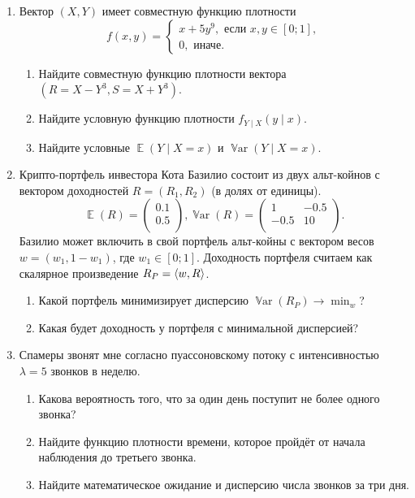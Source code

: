 \documentclass[12pt]{article}
\DeclareMathOperator{\Var}{\mathbb{V}ar}
\DeclarePairedDelimiter{\scalp}{\langle}{\rangle}
\DeclareMathOperator{\E}{\mathbb{E}}
\begin{document}
\begin{enumerate}
    \item Вектор $(X, Y)$ имеет совместную функцию плотности 
    \[
    f(x, y) = \begin{cases}
        x + 5y^9, \text{ если } x, y \in [0;1], \\
        0, \text{ иначе.}
    \end{cases}
    \]
    \begin{enumerate}
        \item Найдите совместную функцию плотности вектора $(R = X - Y^3, S = X + Y^3)$.
        \item Найдите условную функцию плотности $f_{Y\mid X}(y \mid x)$.
        \item Найдите условные $\E(Y\mid X = x)$ и $\Var(Y \mid X = x)$.
    \end{enumerate}

    \item Крипто-портфель инвестора Кота Базилио состоит из двух альт-койнов с вектором доходностей $R = (R_1, R_2)$ (в долях от единицы).
    \[
    \E(R) = \begin{pmatrix}
        0.1 \\
        0.5 \\
    \end{pmatrix}, 
    \Var(R) = \begin{pmatrix}
        1 & -0.5 \\
        -0.5 & 10 \\
    \end{pmatrix}.
    \]
    Базилио может включить в свой портфель альт-койны с вектором весов $w = (w_1, 1 - w_1)$, где $w_1 \in [0;1]$.
    Доходность портфеля считаем как скалярное произведение $R_P = \scalp{w, R}$.
    
    \begin{enumerate}
        \item Какой портфель минимизирует дисперсию $\Var(R_P) \to \min_w$?
        \item Какая будет доходность у портфеля с минимальной дисперсией?
    \end{enumerate}

    \item Спамеры звонят мне согласно пуассоновскому потоку с интенсивностью $\lambda = 5$ звонков в неделю. 
    \begin{enumerate}
        \item Какова вероятность того, что за один день поступит не более одного звонка?
        \item Найдите функцию плотности времени, которое пройдёт от начала наблюдения до третьего звонка. 
        \item Найдите математическое ожидание и дисперсию числа звонков за три дня. 
    \end{enumerate}


\end{enumerate}
\end{document}
